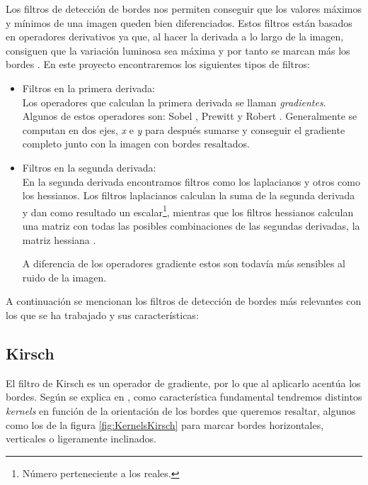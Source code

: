 Los filtros de detección de bordes nos permiten conseguir que los valores máximos y mínimos de una imagen queden bien diferenciados. Estos filtros están basados en operadores derivativos ya que, al hacer la derivada a lo largo de la imagen, consiguen que la variación luminosa sea máxima y por tanto se marcan más los bordes \cite{ubu:ApuntesHardware}. En este proyecto encontraremos los siguientes tipos de filtros:
\begin{itemize}
    \item Filtros en la primera derivada:\label{ct:PrimeraDerivada}\\    
    Los operadores que calculan la primera derivada se llaman \textit{gradientes}. Algunos de estos operadores son: Sobel \cite{wiki:Sobel}, Prewitt \cite{wiki:Prewitt} y Robert \cite{wiki:RobertOperator}. Generalmente se computan en dos ejes, \textit{x} e \textit{y} para después sumarse y conseguir el gradiente completo junto con la imagen con bordes resaltados.
    \item Filtros en la segunda derivada: \label{ct:SegundaDerivada}\\   
   En la segunda derivada encontramos filtros como los laplacianos y otros como los hessianos. Los filtros laplacianos calculan la suma de la segunda derivada y dan como resultado un escalar\footnote{Número perteneciente a los reales.}, mientras que los filtros hessianos calculan una matriz con todas las posibles combinaciones de las segundas derivadas, la matriz hessiana \cite{wiki:HessianMatrix}.
   
   A diferencia de los operadores gradiente estos son todavía más sensibles al ruido de la imagen.
\end{itemize}

A continuación se mencionan los filtros de detección de bordes más relevantes con los que se ha trabajado y sus características:

\subsection{Kirsch}
\label{Kirsch}
El filtro de Kirsch es un operador de gradiente, por lo que al aplicarlo acentúa los bordes. Según se explica en \cite{scholar:venmathi2016kirsch}, como característica fundamental tendremos distintos \textit{kernels} en función de la orientación de los bordes que queremos resaltar, algunos como los de la figura \ref{fig:KernelsKirsch} para marcar bordes horizontales, verticales o ligeramente inclinados.

